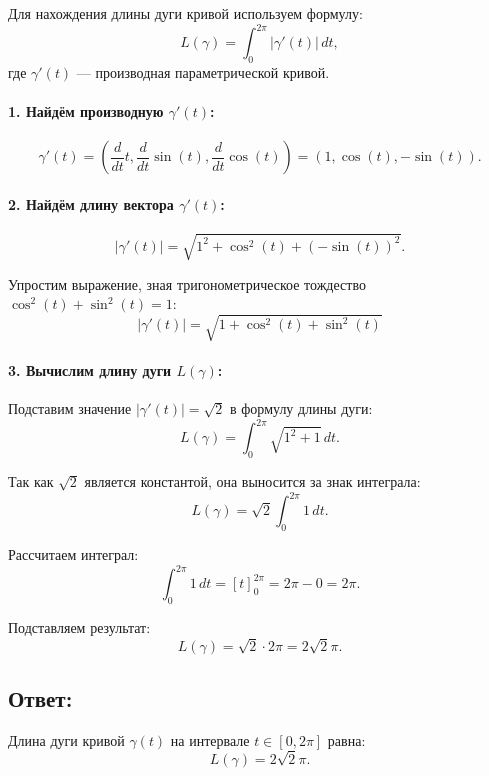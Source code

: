 \documentclass{article}
\begin{document}
        Для нахождения длины дуги кривой используем формулу:
        \[
        L(\gamma) = \int_0^{2\pi} \left|\gamma'(t)\right| \, dt,
        \]
        где \( \gamma'(t) \) — производная параметрической кривой.
        
        \paragraph{1. Найдём производную \( \gamma'(t) \):}
        \[
        \gamma'(t) = \left( \frac{d}{dt}t, \frac{d}{dt}\sin(t), \frac{d}{dt}\cos(t) \right) = \left( 1, \cos(t), -\sin(t) \right).
        \]
        
        \paragraph{2. Найдём длину вектора \( \gamma'(t) \):}
        \[
        \left|\gamma'(t)\right| = \sqrt{1^2 + \cos^2(t) + (-\sin(t))^2}.
        \]
        
        Упростим выражение, зная тригонометрическое тождество \( \cos^2(t) + \sin^2(t) = 1 \):
        \[
        \left|\gamma'(t)\right| = \sqrt{1 + \cos^2(t) + \sin^2(t)}
        \]
        
        \paragraph{3. Вычислим длину дуги \( L(\gamma) \):}
        Подставим значение \( \left|\gamma'(t)\right| = \sqrt{2} \) в формулу длины дуги:
        \[
        L(\gamma) = \int_0^{2\pi} \sqrt{1^2 + 1} \, dt.
        \]
        
        Так как \( \sqrt{2} \) является константой, она выносится за знак интеграла:
        \[
        L(\gamma) = \sqrt{2} \int_0^{2\pi} 1 \, dt.
        \]
        
        Рассчитаем интеграл:
        \[
        \int_0^{2\pi} 1 \, dt = \left[t\right]_0^{2\pi} = 2\pi - 0 = 2\pi.
        \]
        
        Подставляем результат:
        \[
        L(\gamma) = \sqrt{2} \cdot 2\pi = 2\sqrt{2}\pi.
        \]
        
        \subsection*{Ответ:}
        Длина дуги кривой \( \gamma(t) \) на интервале \( t \in [0, 2\pi] \) равна:
        \[
        L(\gamma) = 2\sqrt{2}\pi.
        \]
\end{document}
